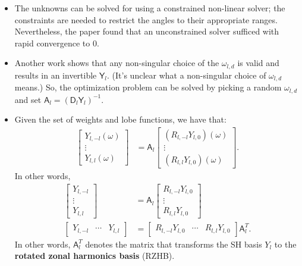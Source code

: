 \documentclass[10pt]{article}
\begin{document}
\begin{itemize}
        \item The unknowns can be solved for using a constrained non-linear solver; the constraints are needed to restrict the angles to their appropriate ranges.  Nevertheless, the paper found that an unconstrained solver sufficed with rapid convergence to $0$.

        \item Another work \cite{Lessig:2012} shows that any non-singular choice of the $\omega_{l,d}$ is valid and results in an invertible $\mathsf{Y}_l$.  (It's unclear what a non-singular choice of $\omega_{l,d}$ means.)  So, the optimization problem can be solved by picking a random $\omega_{l,d}$ and set $\mathsf{A}_l = (\mathsf{D}_l \mathsf{Y}_l)^{-1}$.

        \item Given the set of weights and lobe functions, we have that:
        \begin{align*}
            \begin{bmatrix}
                Y_{l,-l}(\omega) \\
                \vdots \\
                Y_{l,l}(\omega)
            \end{bmatrix}            
            &= 
            \mathsf{A}_l
            \begin{bmatrix}
                (R_{l,-l} Y_{l,0}) (\omega) \\
                \vdots \\
                (R_{l,l} Y_{l,0}) (\omega)
            \end{bmatrix}.
        \end{align*}
        In other words,
        \begin{align*}
            \begin{bmatrix}
                Y_{l,-l} \\
                \vdots \\
                Y_{l,l}
            \end{bmatrix}            
            &= 
            \mathsf{A}_l
            \begin{bmatrix}
                R_{l,-l} Y_{l,0} \\
                \vdots \\
                R_{l,l} Y_{l,0}
            \end{bmatrix} \\
            \begin{bmatrix}
                Y_{l,-l} &
                \cdots &
                Y_{l,l}
            \end{bmatrix}
            &= 
            \begin{bmatrix}
                R_{l,-l} Y_{l,0} &
                \cdots &
                R_{l,l} Y_{l,0}
            \end{bmatrix}
            \mathsf{A}_l^T.
        \end{align*}
        In other words, $\mathsf{A}_l^T$ denotes the matrix that transforms the SH basis $Y_l$ to the \textbf{rotated zonal harmonics basis} (RZHB).


\end{itemize}
\end{document}
